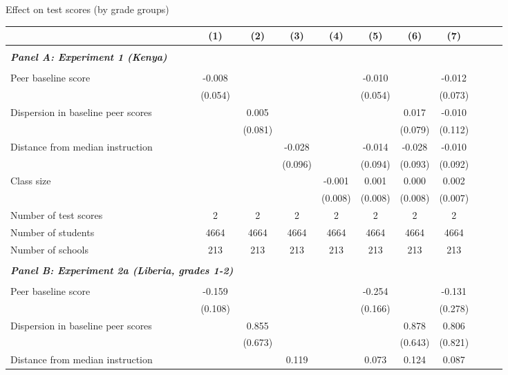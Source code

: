 \begin{center} 
\caption{\small Effect on test scores (by grade groups)} 
\label{tab:descriptives} 
\begin{scriptsize}
\begin{threeparttable}
\begin{tabular} {@{} l l c c c c c c c c c c  @{}} \toprule \toprule
& &(1)&(2)&(3)&(4)&(5)&(6)&(7) \\ \midrule 
\\
\multicolumn{3}{l}{\textbf{\textit{Panel A: Experiment 1 (Kenya)}}} \\
\\
Peer baseline score &  & -0.008 &  &  &  & -0.010 &  & -0.012 \\
                 &  & (0.054) &  &  &  & (0.054) &  & (0.073) \\
Dispersion in baseline peer scores &  &  & 0.005 &  &  &  & 0.017 & -0.010 \\
                 &  &  & (0.081) &  &  &  & (0.079) & (0.112) \\
Distance from median instruction &  &  &  & -0.028 &  & -0.014 & -0.028 & -0.010 \\
                 &  &  &  & (0.096) &  & (0.094) & (0.093) & (0.092) \\
Class size &  &  &  &  & -0.001 & 0.001 & 0.000 & 0.002 \\
                 &  &  &  &  & (0.008) & (0.008) & (0.008) & (0.007) \\
\midrule
Number of test scores &  & 2 & 2 & 2 & 2 & 2 & 2 & 2 \\
Number of students &  & 4664 & 4664 & 4664 & 4664 & 4664 & 4664 & 4664 \\
Number of schools &  & 213 & 213 & 213 & 213 & 213 & 213 & 213 \\
 \midrule
\\
\multicolumn{3}{l}{\textbf{\textit{Panel B: Experiment 2a (Liberia, grades 1-2)}}} \\
\\
Peer baseline score &  & -0.159 &  &  &  & -0.254 &  & -0.131 \\
                 &  & (0.108) &  &  &  & (0.166) &  & (0.278) \\
Dispersion in baseline peer scores &  &  & 0.855 &  &  &  & 0.878 & 0.806 \\
                 &  &  & (0.673) &  &  &  & (0.643) & (0.821) \\
Distance from median instruction &  &  &  & 0.119 &  & 0.073 & 0.124 & 0.087 \\

\end{tabular}
\end{threeparttable}
\end{scriptsize}
\end{center}
